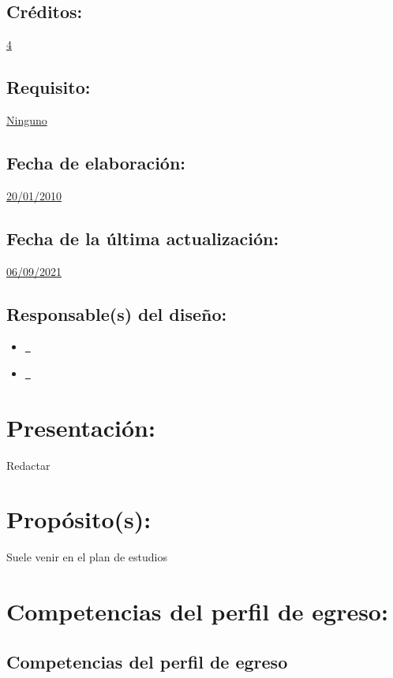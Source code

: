 \documentclass[10 pt]{article}
\begin{document}
\subsection{Cr\'{e}ditos:} \underline{4} %
\subsection{Requisito:} \underline{Ninguno} %
\subsection{Fecha de elaboraci\'{o}n:} \underline{20/01/2010}
\subsection{Fecha de la \'{u}ltima actualizaci\'{o}n:} \underline{06/09/2021}
\subsection{Responsable(s) del dise\~{n}o:}
\begin{itemize}[label={}]
\item \underline{\narturo~\arturo} %
\item \underline{\nelisa~\elisa} %
\end{itemize}
\newpage
\section{Presentaci\'{o}n:}

Redactar

\section{Prop\'{o}sito(s):}

Suele venir en el plan de estudios

\section{Competencias del perfil de egreso:}
\subsection{Competencias del perfil de egreso}


\end{document}
